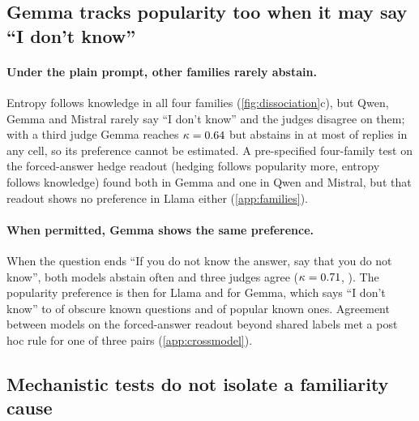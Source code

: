 \documentclass{article}
\newcommand{\idk}{``I don't know''}
\begin{document}
\subsection{Gemma tracks popularity too when it may say \idk}
\label{sec:families}

\paragraph{Under the plain prompt, other families rarely abstain.} Entropy follows knowledge in all four families (\cref{fig:dissociation}c), but Qwen, Gemma and Mistral rarely say \idk{} and the judges disagree on them; with a third judge Gemma reaches $\kappa=0.64$ but abstains in at most \tjGemmaObsUnk{} of replies in any cell, so its preference cannot be estimated. A pre-specified four-family test on the forced-answer hedge readout (hedging follows popularity more, entropy follows knowledge) found both in Gemma and one in Qwen and Mistral, but that readout shows no preference in Llama either (\cref{app:families}).

\paragraph{When permitted, Gemma shows the same preference.} When the question ends ``If you do not know the answer, say that you do not know'', both models abstain often and three judges agree ($\kappa=0.71$, \pmGemmaKappa). The popularity preference is then \pmLlamaDiff{} \pmLlamaDiffCI{} for Llama and \pmGemmaDiff{} \pmGemmaDiffCI{} for Gemma, which says \idk{} to \pmGemmaObsKnown{} of obscure known questions and \pmGemmaPopKnown{} of popular known ones. Agreement between models on the forced-answer readout beyond shared labels met a post hoc rule for one of three pairs (\cref{app:crossmodel}).

\subsection{Mechanistic tests do not isolate a familiarity cause}
\label{sec:mech}
\end{document}
